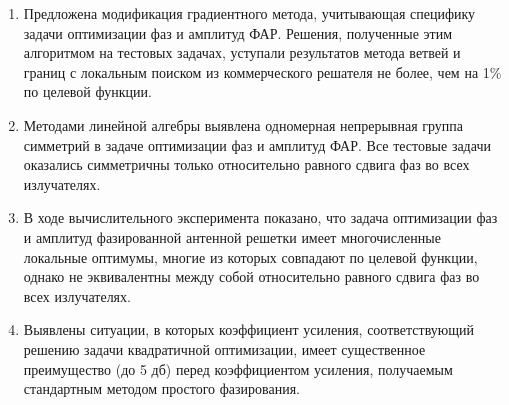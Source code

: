 \begin{enumerate}
\item Предложена модификация градиентного метода, учитывающая специфику задачи оптимизации фаз и амплитуд ФАР. Решения, полученные этим алгоритмом на тестовых задачах, уступали результатов метода ветвей и границ с локальным поиском из коммерческого решателя не более, чем на 1\% по целевой функции.
  \item Методами линейной алгебры выявлена одномерная непрерывная группа симметрий в задаче оптимизации фаз и амплитуд ФАР. Все тестовые задачи оказались симметричны только относительно равного сдвига фаз во всех излучателях.
  \item В ходе вычислительного эксперимента показано, что задача оптимизации фаз и амплитуд фазированной антенной решетки имеет многочисленные локальные оптимумы, многие из которых совпадают по целевой функции, однако не эквивалентны между собой относительно равного сдвига фаз во всех излучателях.
  \item Выявлены ситуации, в которых коэффициент усиления, соответствующий решению задачи квадратичной оптимизации, имеет существенное преимущество (до 5 дб) перед коэффициентом усиления, получаемым стандартным методом простого фазирования. 
\end{enumerate}
